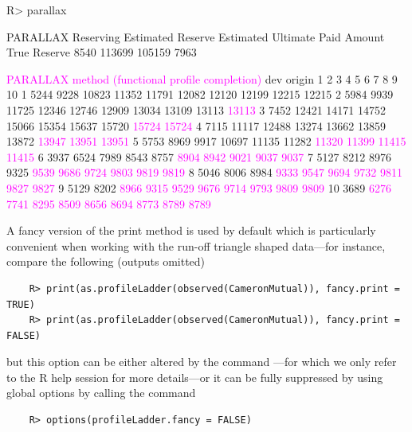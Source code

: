 \begin{example}[commandchars=\\\{\}]
    R> parallax 

    PARALLAX Reserving 
       Estimated Reserve   Estimated Ultimate   Paid Amount   True Reserve 
                    8540               113699        105159           7963

    \textcolor{magenta}{PARALLAX method (functional profile completion)}
           dev
    origin    1     2     3     4     5     6     7     8     9    10
        1  5244  9228 10823 11352 11791 12082 12120 12199 12215 12215
        2  5984  9939 11725 12346 12746 12909 13034 13109 13113 \textcolor{magenta}{13113}
        3  7452 12421 14171 14752 15066 15354 15637 15720 \textcolor{magenta}{15724 15724}
        4  7115 11117 12488 13274 13662 13859 13872 \textcolor{magenta}{13947 13951 13951}
        5  5753  8969  9917 10697 11135 11282 \textcolor{magenta}{11320 11399 11415 11415}
        6  3937  6524  7989  8543  8757  \textcolor{magenta}{8904  8942  9021  9037  9037}
        7  5127  8212  8976  9325  \textcolor{magenta}{9539  9686  9724  9803  9819  9819}
        8  5046  8006  8984  \textcolor{magenta}{9333  9547  9694  9732  9811  9827  9827}
        9  5129  8202  \textcolor{magenta}{8966  9315  9529  9676  9714  9793  9809  9809}
        10 3689  \textcolor{magenta}{6276}  \textcolor{magenta}{7741}  \textcolor{magenta}{8295}  \textcolor{magenta}{8509}  \textcolor{magenta}{8656}  \textcolor{magenta}{8694}  \textcolor{magenta}{8773}  \textcolor{magenta}{8789}  \textcolor{magenta}{8789}       
\end{example}
A fancy version of the print method is used by default which is particularly convenient when working with the run-off triangle shaped data---for instance, compare the following (outputs omitted)
\begin{verbatim}
    R> print(as.profileLadder(observed(CameronMutual)), fancy.print = TRUE)
    R> print(as.profileLadder(observed(CameronMutual)), fancy.print = FALSE)
\end{verbatim}
but this option can be either altered by the command ---for which we only refer to the R help session for more details---or it can be fully suppressed by using global options by calling the command 
\begin{verbatim}
    R> options(profileLadder.fancy = FALSE)
\end{verbatim}

